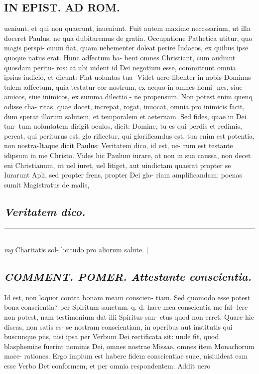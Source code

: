 \documentclass{article}
\begin{document}
\begin{pages}
\section*{IN EPIST. AD ROM.  }
\marginpar{[ p.108 ]}\pstart ueniunt, et qui non quaerunt, inueniunt. Fuit autem maxime necessarium, ut illa doceret Paulus, ne qua dubitaremus de gratia.   \pend\pstart Occupatione Pathetica utitur, quo magis perspi- cuum fiat, quam uehementer doleat perire Iudaeos, ex quibus ipse quoque natus erat. Hunc adfectum ha- bent omnes Christiant, cum audiunt quosdam peritu- ros: at ubi uident id Dei negotium esse, committunt omnia ipsius iudicio, et dicunt: Fiat uoluntas tua- Videt uero libenter in nobis Dominus talem adfectum, quia testatur cor nostrum, ex aequo in omnes homi- nes, siue amicos, siue inimicos, ex summa dilectio - ne propensum. Non potest enim quenq odisse cha- ritas, quae docet, increpat, rogat, inuocat, omnia pro inimicis facit, dum sperat illorum salutem, et temporalem et aeternam. Sed fides, quae in Dei tan- tum uoluntatem dirigit oculos, dicit: Domine, tu es qui perdis et redimis, pereat, qui periturus est, glo rificetur, qui glorificandus est, tua enim est potentia, non nostra-Itaque dicit Paulus: Veritatem dico, id est, ue- rum est testante idipsum in me Christo. Vides hic Paulum iurare, at non in sua caussa, non decet eni Christianum, ut uel iuret, uel litiget, aut uindictam quaerat propter se Iurarunt Apli, sed propter frens, propter Dei glo- riam amplificandam: poenas sumit Magistratus de malis,  \pend
{}
{}
\subsection*{\textit{Veritatem dico. }}
\vspace{0.5cm}\noindent
\vspace{0.2cm}\rule{1cm}{0.2pt}\\ 
\hspace{0.2cm}\textit{mg}
\footnotesize Charitatis sol- licitudo pro aliorum salute.  
\normalsize| 
\marginpar{[ p.non ]}
{}
\subsection*{\textit{\huge\textbf{COMMENT. POMER. }\normalsize Attestante conscientia. }}\pstart Id est, non loquor contra bonam meam conscien- tiam. Sed quomodo esse potest bona conscientia? per Spiritum sanctum. q. d. haec mea conscientia me fal- lere non potest, nam testimonium dat illi Spiritus san- ctus quod non erret. Quare hic discas, non satis es- se nostram conscientiam, in operibus aut institutis qui buscunque piis, nisi ipsa per Verbum Dei rectificata sit: unde fit, quod blasphemiae fuerint nominis Dei, omnes nostrae Missae, omnes item Monachorum mace- rationes. Ergo impium est habere fidem conscientiae suae, nisiuideat eam esse Verbo Det conformem, et per omnia respondentem. Addit uero  \pend
{}
{}

\end{pages}
\end{document}

